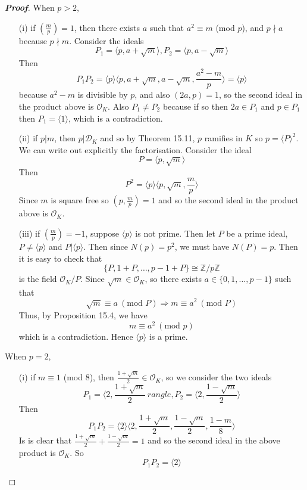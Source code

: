 \begin{proof}[\bf Proof] When $p>2$,
\begin{enumerate}
\item[(i)] if $(\frac{m}{p})=1$, then there exists $a$ such that $a^2 \equiv m$ (mod $p$), and $p \nmid a$ because $p \nmid m$. Consider the ideals
$$P_1=\langle p, a+\sqrt{m} \rangle, P_2=\langle p,a-\sqrt{m} \rangle$$
Then
$$P_1P_2=\langle p \rangle
\langle p,a+\sqrt{m},a-\sqrt{m},\frac{a^2-m}{p} \rangle=\langle p \rangle$$
because $a^2-m$ is divisible by $p$, and also $(2a,p)=1$, so the second ideal in the product above is $\mathcal{O}_K$.
Also $P_1 \neq P_2$ because if so then $2a \in P_1$ and $p \in P_1$ then $P_1=\langle 1 \rangle$, which is a contradiction.\\
\item[(ii)] if $p|m$, then $p|\mathcal{D}_K$ and so by Theorem 15.11, $p$ ramifies in $K$ so $p=\langle P\rangle^2$. We can write out explicitly the factorisation. Consider the ideal
$$P=\langle p,\sqrt{m} \rangle$$
Then
$$P^2=\langle p \rangle \langle p,\sqrt{m},\frac{m}{p}\rangle$$
Since $m$ is square free so $(p,\frac{m}{p})=1$ and so the second ideal in the product above is $\mathcal{O}_K$.\\
\item[(iii)] if $(\frac{m}{p})=-1$, suppose $\langle p \rangle$ is not prime. Then let $P$ be a prime ideal, $P \neq \langle p \rangle$ and $P|\langle p \rangle$. Then since $N(p)=p^2$, we must have $N(P)=p$. Then it is easy to check that
    $$\{P,1+P,\ldots,p-1+P\} \cong \mathbb{Z}/p\mathbb{Z}$$
    is the field $\mathcal{O}_K/P$. Since $\sqrt{m} \in \mathcal{O}_K$, so there exists
    $a \in \{0,1,\ldots,p-1\}$ such that
    $$\sqrt{m} \equiv a~(\text{mod } P) \Rightarrow m \equiv a^2~(\text{mod } P)$$
    Thus, by Proposition 15.4, we have
    $$m \equiv a^2~(\text{mod } p)$$
    which is a contradiction. Hence $\langle p \rangle$ is a prime.
\end{enumerate}
When $p=2$,
\begin{enumerate}
\item[(i)] if $m \equiv 1$ (mod $8$), then $\frac{1+\sqrt{m}}{2} \in \mathcal{O}_K$, so we consider the two ideals
    $$P_1=\langle 2,\frac{1+\sqrt{m}}{2}\ rangle, P_2=\langle 2,\frac{1-\sqrt{m}}{2} \rangle$$
    Then
    $$P_1P_2=\langle 2 \rangle \langle 2,\frac{1+\sqrt{m}}{2},\frac{1-\sqrt{m}}{2},\frac{1-m}{8} \rangle$$
    Is is clear that $\frac{1+\sqrt{m}}{2}+\frac{1-\sqrt{m}}{2}=1$ and so the second ideal in the above product
    is
    $\mathcal{O}_K$. So $$P_1P_2=\langle 2 \rangle$$

\end{enumerate}
\end{proof}
